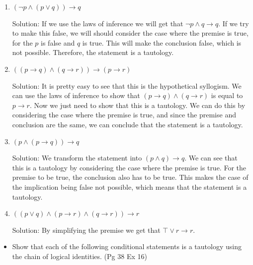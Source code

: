 \documentclass[11pt]{article}
\begin{document}
\begin{enumerate}
\item \((\neg p \land (p \lor q)) \to q\)

Solution: If we use the laws of inference we will get that \(\neg p \land q \to q\). If we try to make this false, we will should consider the case where the premise is true, for the \(p\) is false and \(q\) is true. This will make the conclusion false, which is not possible. Therefore, the statement is a tautology.

\item \(((p\to q) \land (q\to r)) \to (p \to r)\)

Solution: It is pretty easy to see that this is the hypothetical syllogism. We can use the laws of inference to show that \((p\to q) \land (q\to r)\) is equal to \(p \to r\). Now we just need to show that this is a tautology. We can do this by considering the case where the premise is true, and since the premise and conclusion are the same, we can conclude that the statement is a tautology.

\item \((p \land (p \to q)) \to q\)

Solution: We transform the statement into \((p \land q) \to q\). We can see that this is a tautology by considering the case where the premise is true. For the premise to be true, the conclusion also has to be true. This makes the case of the implication being false not possible, which means that the statement is a tautology.

\item \(((p\lor q) \land (p \to r) \land (q \to r)) \to r\)

Solution: By simplifying the premise we get that \(\top \lor r \to r\).
\end{enumerate}
\begin{itemize}
\item Show that each of the following conditional statements is a tautology using the chain of logical identities. (Pg 38 Ex 16)
\end{itemize}
\end{document}
